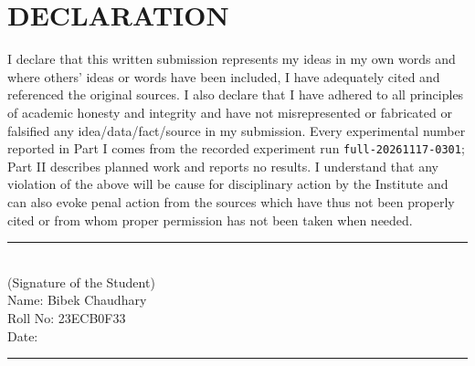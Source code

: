 \chapter*{\normalsize DECLARATION}

\noindent I declare that this written submission represents my ideas in my own words and where others' ideas or words have been included, I have adequately cited and referenced the original sources. I also declare that I have adhered to all principles of academic honesty and integrity and have not misrepresented or fabricated or falsified any idea/data/fact/source in my submission. Every experimental number reported in Part I comes from the recorded experiment run \texttt{full-20261117-0301}; Part II describes planned work and reports no results. I understand that any violation of the above will be cause for disciplinary action by the Institute and can also evoke penal action from the sources which have thus not been properly cited or from whom proper permission has not been taken when needed.

\vspace{1.4cm}
\noindent\rule{6.5cm}{0.4pt}\\
(Signature of the Student)\\
Name: Bibek Chaudhary\\
Roll No: 23ECB0F33\\
Date: \rule{3cm}{0.4pt}
\clearpage

